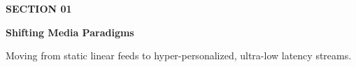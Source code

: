 \documentclass[aspectratio=169,11pt]{beamer}
\begin{document}
{
\begin{frame}[plain]
  \vspace*{36pt}
  \begin{minipage}{0.85\textwidth}
    {\color{accentcyan}\large\bfseries\faGlobe\quad SECTION 01} \par
    \vspace{12pt}
    {\fontsize{26pt}{32pt}\selectfont \color{white}\bfseries Shifting Media Paradigms} \par
    \vspace{8pt}
    {\fontsize{14pt}{18pt}\selectfont \color{textlight} Moving from static linear feeds to hyper-personalized, ultra-low latency streams.}
  \end{minipage}
  \vspace*{24pt}
\end{frame}
}
\end{document}

